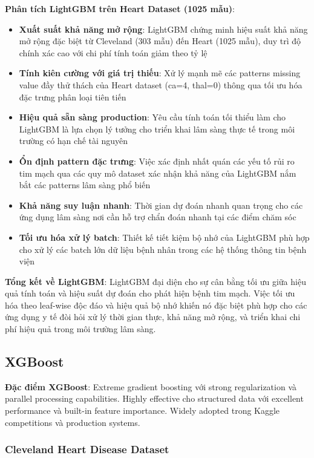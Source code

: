 \textbf{Phân tích LightGBM trên Heart Dataset (1025 mẫu)}:
\begin{itemize}[leftmargin=*]
    \item \textbf{Xuất suất khả năng mở rộng}: LightGBM chứng minh hiệu suất khả năng mở rộng đặc biệt từ Cleveland (303 mẫu) đến Heart (1025 mẫu), duy trì độ chính xác cao với chi phí tính toán giảm theo tỷ lệ
    \item \textbf{Tính kiên cường với giá trị thiếu}: Xử lý mạnh mẽ các patterns missing value đầy thử thách của Heart dataset (ca=4, thal=0) thông qua tối ưu hóa đặc trưng phân loại tiên tiến
    \item \textbf{Hiệu quả sẵn sàng production}: Yêu cầu tính toán tối thiểu làm cho LightGBM là lựa chọn lý tưởng cho triển khai lâm sàng thực tế trong môi trường có hạn chế tài nguyên
    \item \textbf{Ổn định pattern đặc trưng}: Việc xác định nhất quán các yếu tố rủi ro tim mạch qua các quy mô dataset xác nhận khả năng của LightGBM nắm bắt các patterns lâm sàng phổ biến
    \item \textbf{Khả năng suy luận nhanh}: Thời gian dự đoán nhanh quan trọng cho các ứng dụng lâm sàng nơi cần hỗ trợ chẩn đoán nhanh tại các điểm chăm sóc
    \item \textbf{Tối ưu hóa xử lý batch}: Thiết kế tiết kiệm bộ nhớ của LightGBM phù hợp cho xử lý các batch lớn dữ liệu bệnh nhân trong các hệ thống thông tin bệnh viện
\end{itemize}

\textbf{Tổng kết về LightGBM}: LightGBM đại diện cho sự cân bằng tối ưu giữa hiệu quả tính toán và hiệu suất dự đoán cho phát hiện bệnh tim mạch. Việc tối ưu hóa theo leaf-wise độc đáo và hiệu quả bộ nhớ khiến nó đặc biệt phù hợp cho các ứng dụng y tế đòi hỏi xử lý thời gian thực, khả năng mở rộng, và triển khai chi phí hiệu quả trong môi trường lâm sàng.

\FloatBarrier

\subsection{XGBoost}\label{subsec:xgboost}

\textbf{Đặc điểm XGBoost}: Extreme gradient boosting với strong regularization và parallel processing capabilities. Highly effective cho structured data với excellent performance và built-in feature importance. Widely adopted trong Kaggle competitions và production systems.

\subsubsection{Cleveland Heart Disease Dataset}\label{subsubsec:xgb-cleveland}

